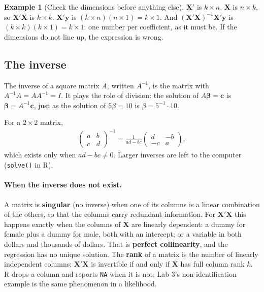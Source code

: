 \documentclass[11pt]{article}
\theoremstyle{definition}
\newtheorem{example}{Example}[section]
\newcommand{\X}{\bm{X}}
\newcommand{\Y}{\bm{y}}
\newcommand{\bbeta}{\bm{\beta}}
\begin{document}
\begin{example}[Check the dimensions before anything else]
$\X'$ is $k \times n$, $\X$ is $n \times k$, so $\X'\X$ is $k \times k$.
$\X'\Y$ is $(k \times n)(n \times 1) = k \times 1$. And $(\X'\X)^{-1}\X'\Y$
is $(k\times k)(k \times 1) = k \times 1$: one number per coefficient, as it
must be. If the dimensions do not line up, the expression is wrong.
\end{example}

\subsection{The inverse}

The inverse of a square matrix $A$, written $A^{-1}$, is the matrix with
$A^{-1}A = AA^{-1} = I$. It plays the role of division: the solution of
$A\bbeta = \bm c$ is $\bbeta = A^{-1}\bm c$, just as the solution of
$5\beta = 10$ is $\beta = 5^{-1}\cdot 10$.

For a $2 \times 2$ matrix,
\begin{align*}
  \begin{pmatrix} a & b \\ c & d \end{pmatrix}^{-1}
  = \frac{1}{ad - bc}\begin{pmatrix} d & -b \\ -c & a \end{pmatrix},
\end{align*}
which exists only when $ad - bc \ne 0$. Larger inverses are left to the
computer (\texttt{solve()} in R).

\paragraph{When the inverse does not exist.} A matrix is
\textbf{singular} (no inverse) when one of its columns is a linear
combination of the others, so that the columns carry redundant information.
For $\X'\X$ this happens exactly when the columns of $\X$ are linearly
dependent: a dummy for female plus a dummy for male, both with an intercept;
or a variable in both dollars and thousands of dollars. That is
\textbf{perfect collinearity}, and the regression has no unique solution.
The \textbf{rank} of a matrix is the number of linearly independent
columns; $\X'\X$ is invertible if and only if $\X$ has full column rank
$k$. R drops a column and reports \texttt{NA} when it is not; Lab 3's
non-identification example is the same phenomenon in a likelihood.
\end{document}
